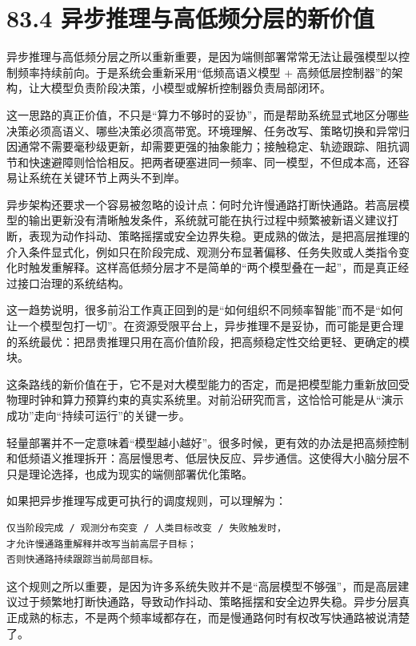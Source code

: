 \section*{83.4 异步推理与高低频分层的新价值}


异步推理与高低频分层之所以重新重要，是因为端侧部署常常无法让最强模型以控制频率持续前向。于是系统会重新采用“低频高语义模型 + 高频低层控制器”的架构，让大模型负责阶段决策，小模型或解析控制器负责局部闭环。

这一思路的真正价值，不只是“算力不够时的妥协”，而是帮助系统显式地区分哪些决策必须高语义、哪些决策必须高带宽。环境理解、任务改写、策略切换和异常归因通常不需要毫秒级更新，却需要更强的抽象能力；接触稳定、轨迹跟踪、阻抗调节和快速避障则恰恰相反。把两者硬塞进同一频率、同一模型，不但成本高，还容易让系统在关键环节上两头不到岸。

异步架构还要求一个容易被忽略的设计点：何时允许慢通路打断快通路。若高层模型的输出更新没有清晰触发条件，系统就可能在执行过程中频繁被新语义建议打断，表现为动作抖动、策略摇摆或安全边界失稳。更成熟的做法，是把高层推理的介入条件显式化，例如只在阶段完成、观测分布显著偏移、任务失败或人类指令变化时触发重解释。这样高低频分层才不是简单的“两个模型叠在一起”，而是真正经过接口治理的系统结构。

这一趋势说明，很多前沿工作真正回到的是“如何组织不同频率智能”而不是“如何让一个模型包打一切”。在资源受限平台上，异步推理不是妥协，而可能是更合理的系统最优：把昂贵推理只用在高价值阶段，把高频稳定性交给更轻、更确定的模块。

这条路线的新价值在于，它不是对大模型能力的否定，而是把模型能力重新放回受物理时钟和算力预算约束的真实系统里。对前沿研究而言，这恰恰可能是从“演示成功”走向“持续可运行”的关键一步。

轻量部署并不一定意味着“模型越小越好”。很多时候，更有效的办法是把高频控制和低频语义推理拆开：高层慢思考、低层快反应、异步通信。这使得大小脑分层不只是理论选择，也成为现实的端侧部署优化策略。

如果把异步推理写成更可执行的调度规则，可以理解为：

\begin{lstlisting}
仅当阶段完成 / 观测分布突变 / 人类目标改变 / 失败触发时，
才允许慢通路重解释并改写当前高层子目标；
否则快通路持续跟踪当前局部目标。
\end{lstlisting}

这个规则之所以重要，是因为许多系统失败并不是“高层模型不够强”，而是高层建议过于频繁地打断快通路，导致动作抖动、策略摇摆和安全边界失稳。异步分层真正成熟的标志，不是两个频率域都存在，而是慢通路何时有权改写快通路被说清楚了。

